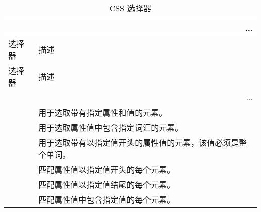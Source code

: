 \begin{longtable}{|p{80pt}|p{200pt}|}
\multicolumn{2}{r}{...}
\tabularnewline\hline
选择器	&	描述
\endhead

\caption{CSS 选择器}\\
\hline
选择器	&描述
\tabularnewline\hline
\endfirsthead


\multicolumn{2}{r}{...}
\endfoot

\endlastfoot

\hline
[attribute]		&用于选取带有指定属性的元素。\\
\hline
[attribute=value]	&用于选取带有指定属性和值的元素。\\
\hline
[attribute~=value]	&用于选取属性值中包含指定词汇的元素。\\
\hline
[attribute|=value]	&用于选取带有以指定值开头的属性值的元素，该值必须是整个单词。\\
\hline
[attribute\^{}=value]	&匹配属性值以指定值开头的每个元素。\\
\hline
[attribute\$=value]	&匹配属性值以指定值结尾的每个元素。\\
\hline
[attribute*=value]	&匹配属性值中包含指定值的每个元素。\\
\hline


\end{longtable}
















































\clearpage



























































